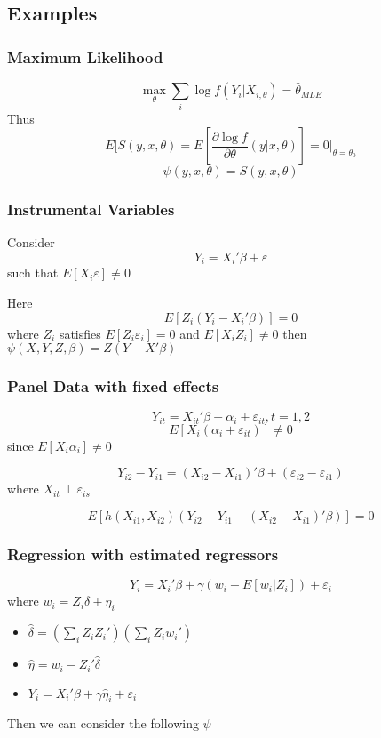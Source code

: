 \documentclass[11pt, a4paper, oneside]{article}
\theoremstyle{definition}
\theoremstyle{proposition}
\theoremstyle{corollary}
\theoremstyle{lemma}
\theoremstyle{theorem}
\begin{document}
\subsection{Examples}
\subsubsection{Maximum Likelihood}
$$\max_{\theta}\sum_i \log{f(Y_i|X_{i, \theta})} = \hat{\theta}_{MLE}$$
Thus $$E[S(y, x, \theta) = E\left[\frac{\partial \log{f}}{\partial \theta}(y|x, \theta)\right]=0|_{\theta= \theta_0}$$
$$\psi(y, x, \theta) = S(y,  x, \theta)$$

\subsubsection{Instrumental Variables}
Consider $$Y_i = X_i'\beta + \varepsilon$$
such that $E[X_i\varepsilon] \neq 0$ 

Here $$E[Z_i(Y_i - X_i'\beta)] = 0$$
where $Z_i$ satisfies $E[Z_i\varepsilon_i] = 0$ and $E[X_iZ_i] \neq 0$
then $\psi(X, Y, Z, \beta) = Z(Y - X'\beta)$

\subsubsection{Panel Data with fixed effects}
$$Y_{it} =X_{it}'\beta+\alpha_i+\varepsilon_{it}, t=1, 2$$
$$E[X_i(\alpha_i+\varepsilon_{it})] \neq 0$$ since $E[X_i\alpha_i] \neq 0$

$$Y_{i2}-Y_{i1} = (X_{i2} - X_{i1})'\beta+(\varepsilon_{i2}-\varepsilon_{i1})$$
where $X_{it}\perp \varepsilon_{is}$ 

$$E[h(X_{i1},X_{i2})(Y_{i2}- Y_{i1} -(X_{i2}-X_{i1})'\beta)] = 0$$

\subsubsection{Regression with estimated regressors}
$$Y_i = X_i'\beta +\gamma(w_i-E[w_i|Z_i]) +\varepsilon_i$$
where $w_i = Z_i \delta +\eta_i$
\begin{itemize}
\item $\hat{\delta} = (\sum_i Z_iZ_i')(\sum_i Z_iw_i')$
\item $\hat{\eta} = w_i - Z_i'\hat{\delta}$ 
\item $Y_i = X_i'\beta+\gamma\hat{\eta}_i + \varepsilon_i$
\end{itemize}

Then we can consider the following $\psi$
\end{document}
